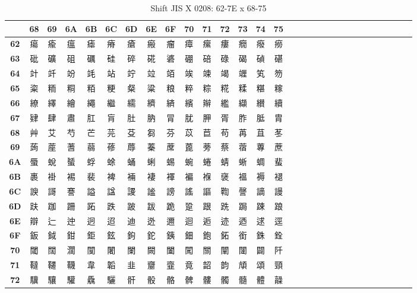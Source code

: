 \begin{table}[H]
\Fontified
\centering
\caption{Shift JIS X 0208: 62-7E x 68-75}
\begin{tabular}{|Sc|Sc|Sc|Sc|Sc|Sc|Sc|Sc|Sc|Sc|Sc|Sc|Sc|Sc|Sc|}
\hline
 & \textbf{68} & \textbf{69} & \textbf{6A} & \textbf{6B} & \textbf{6C} & \textbf{6D} & \textbf{6E} & \textbf{6F} & \textbf{70} & \textbf{71} & \textbf{72} & \textbf{73} & \textbf{74} & \textbf{75} \\ \hline
\textbf{62} & 瘍 & 瘉 & 瘟 & 瘧 & 瘠 & 瘡 & 瘢 & 瘤 & 瘴 & 瘰 & 瘻 & 癇 & 癈 & 癆 \\ \hline
\textbf{63} & 砒 & 礦 & 砠 & 礪 & 硅 & 碎 & 硴 & 碆 & 硼 & 碚 & 碌 & 碣 & 碵 & 碪 \\ \hline
\textbf{64} & 竍 & 竏 & 竕 & 竓 & 站 & 竚 & 竝 & 竡 & 竢 & 竦 & 竭 & 竰 & 笂 & 笏 \\ \hline
\textbf{65} & 粢 & 粫 & 粡 & 粨 & 粳 & 粲 & 粱 & 粮 & 粹 & 粽 & 糀 & 糅 & 糂 & 糘 \\ \hline
\textbf{66} & 繚 & 繹 & 繪 & 繩 & 繼 & 繻 & 纃 & 緕 & 繽 & 辮 & 繿 & 纈 & 纉 & 續 \\ \hline
\textbf{67} & 肄 & 肆 & 肅 & 肛 & 肓 & 肚 & 肭 & 冐 & 肬 & 胛 & 胥 & 胙 & 胝 & 胄 \\ \hline
\textbf{68} & 艸 & 艾 & 芍 & 芒 & 芫 & 芟 & 芻 & 芬 & 苡 & 苣 & 苟 & 苒 & 苴 & 苳 \\ \hline
\textbf{69} & 蒟 & 蓙 & 蓍 & 蒻 & 蓚 & 蓐 & 蓁 & 蓆 & 蓖 & 蒡 & 蔡 & 蓿 & 蓴 & 蔗 \\ \hline
\textbf{6A} & 蜃 & 蛻 & 蜑 & 蜉 & 蜍 & 蛹 & 蜊 & 蜴 & 蜿 & 蜷 & 蜻 & 蜥 & 蜩 & 蜚 \\ \hline
\textbf{6B} & 裹 & 褂 & 裼 & 裴 & 裨 & 裲 & 褄 & 褌 & 褊 & 褓 & 襃 & 褞 & 褥 & 褪 \\ \hline
\textbf{6C} & 諛 & 謌 & 謇 & 謚 & 諡 & 謖 & 謐 & 謗 & 謠 & 謳 & 鞫 & 謦 & 謫 & 謾 \\ \hline
\textbf{6D} & 趺 & 跏 & 跚 & 跖 & 跌 & 跛 & 跋 & 跪 & 跫 & 跟 & 跣 & 跼 & 踈 & 踉 \\ \hline
\textbf{6E} & 辯 & 辷 & 迚 & 迥 & 迢 & 迪 & 迯 & 邇 & 迴 & 逅 & 迹 & 迺 & 逑 & 逕 \\ \hline
\textbf{6F} & 鈑 & 鉞 & 鉗 & 鉅 & 鉉 & 鉤 & 鉈 & 銕 & 鈿 & 鉋 & 鉐 & 銜 & 銖 & 銓 \\ \hline
\textbf{70} & 閾 & 闊 & 濶 & 闃 & 闍 & 闌 & 闕 & 闔 & 闖 & 關 & 闡 & 闥 & 闢 & 阡 \\ \hline
\textbf{71} & 韃 & 韆 & 韈 & 韋 & 韜 & 韭 & 齏 & 韲 & 竟 & 韶 & 韵 & 頏 & 頌 & 頸 \\ \hline
\textbf{72} & 驥 & 驤 & 驩 & 驫 & 驪 & 骭 & 骰 & 骼 & 髀 & 髏 & 髑 & 髓 & 體 & 髞 \\ \hline

\end{tabular}
\end{table}
